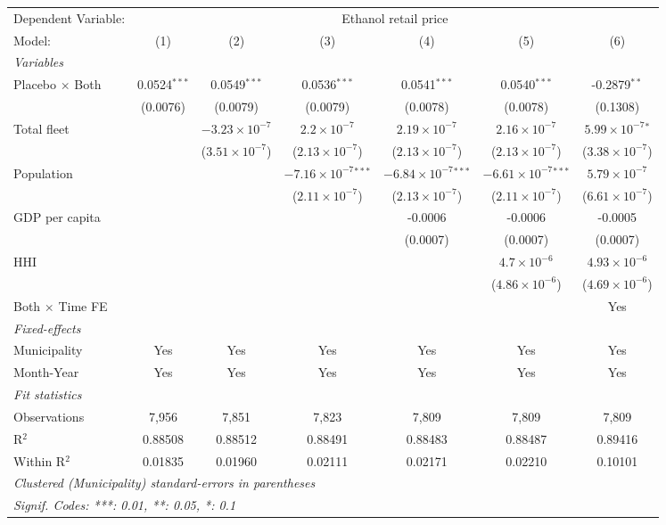 \documentclass[
]{article}
\begin{document}
\begin{tabular}{lcccccc}
\tabularnewline\midrule\midrule
Dependent Variable:&\multicolumn{6}{c}{Ethanol retail price}\\
Model:&(1) & (2) & (3) & (4) & (5) & (6)\\
\midrule \emph{Variables}&   &   &   &   &   &  \\
Placebo $\times $ Both & 0.0524$^{***}$ & 0.0549$^{***}$ & 0.0536$^{***}$ & 0.0541$^{***}$ & 0.0540$^{***}$ & -0.2879$^{**}$\\
  &(0.0076) & (0.0079) & (0.0079) & (0.0078) & (0.0078) & (0.1308)\\
Total fleet &    & $-3.23\times 10^{-7}$ & $2.2\times 10^{-7}$ & $2.19\times 10^{-7}$ & $2.16\times 10^{-7}$ & $5.99\times 10^{-7}$$^{*}$\\
  &   & ($3.51\times 10^{-7}$) & ($2.13\times 10^{-7}$) & ($2.13\times 10^{-7}$) & ($2.13\times 10^{-7}$) & ($3.38\times 10^{-7}$)\\
Population &    &    & $-7.16\times 10^{-7}$$^{***}$ & $-6.84\times 10^{-7}$$^{***}$ & $-6.61\times 10^{-7}$$^{***}$ & $5.79\times 10^{-7}$\\
  &   &    & ($2.11\times 10^{-7}$) & ($2.13\times 10^{-7}$) & ($2.11\times 10^{-7}$) & ($6.61\times 10^{-7}$)\\
GDP per capita &    &    &    & -0.0006 & -0.0006 & -0.0005\\
  &   &    &    & (0.0007) & (0.0007) & (0.0007)\\
HHI &    &    &    &    & $4.7\times 10^{-6}$ & $4.93\times 10^{-6}$\\
  &   &    &    &    & ($4.86\times 10^{-6}$) & ($4.69\times 10^{-6}$)\\
Both $\times$ Time FE &  &  &  &  &  & Yes\\
\midrule \emph{Fixed-effects}&   &   &   &   &   &  \\
Municipality & Yes & Yes & Yes & Yes & Yes & Yes\\
Month-Year & Yes & Yes & Yes & Yes & Yes & Yes\\
\midrule \emph{Fit statistics}&  & & & & & \\
Observations & 7,956&7,851&7,823&7,809&7,809&7,809\\
R$^2$ & 0.88508&0.88512&0.88491&0.88483&0.88487&0.89416\\
Within R$^2$ & 0.01835&0.01960&0.02111&0.02171&0.02210&0.10101\\
\midrule\midrule\multicolumn{7}{l}{\emph{Clustered (Municipality) standard-errors in parentheses}}\\
\multicolumn{7}{l}{\emph{Signif. Codes: ***: 0.01, **: 0.05, *: 0.1}}\\
\end{tabular}
\end{document}
